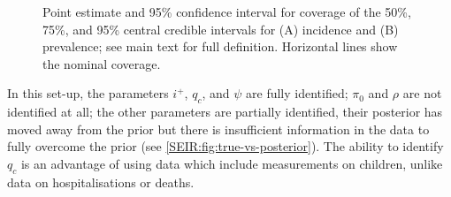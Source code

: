 \documentclass[thesis.tex]{subfiles}
\begin{document}
\begin{figure}
    \caption[Coverage of simulation study (derived quantities)]{%
        Point estimate and 95\% confidence interval for coverage of the 50\%, 75\%, and 95\% central credible intervals for (A) incidence and (B) prevalence; see main text for full definition.
        Horizontal lines show the nominal coverage.
    }
    \label{SEIR:fig:sim-inc-prev}
\end{figure}


In this set-up, the parameters $i^+$, $q_c$, and $\psi$ are fully identified; $\pi_0$ and $\rho$ are not identified at all; the other parameters are partially identified, their posterior has moved away from the prior but there is insufficient information in the data to fully overcome the prior (see \cref{SEIR:fig:true-vs-posterior}).
The ability to identify $q_c$ is an advantage of using data which include measurements on children, unlike data on hospitalisations or deaths.
\end{document}
